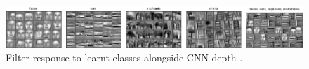 
\begin{figure}[t]
    \centering
    \scriptsize
    \includegraphics[width=\textwidth]{fig/rel/images/conv_layers.pdf}
    \caption{Filter response to learnt classes alongside CNN depth \autocite{lee2009convolutional}.}
    \label{fig:cnn_depth}
\end{figure}